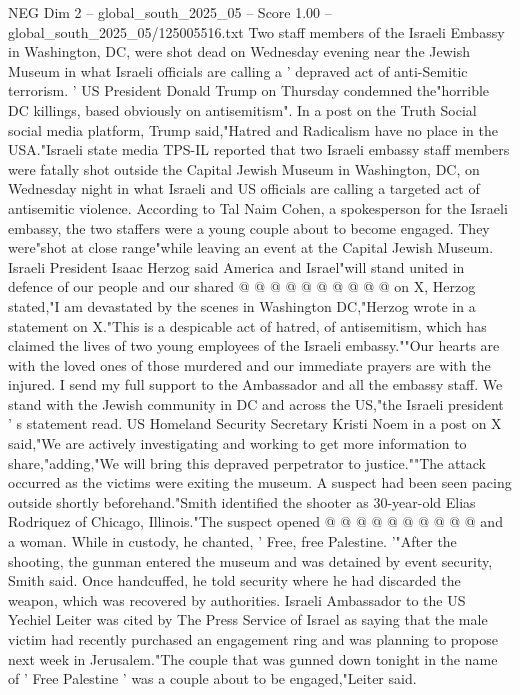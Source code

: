 \begin{textsample}{NEG Dim 2 – global\_south\_2025\_05 – Score 1.00 – global\_south\_2025\_05/125005516.txt}  \label{ex:f2_neg_408}
Two staff members of the Israeli Embassy in Washington, DC, were shot dead on Wednesday evening near the Jewish Museum in what Israeli officials are calling a ' depraved act of anti-Semitic terrorism. ' US President Donald Trump on Thursday condemned the"horrible DC killings, based obviously on antisemitism".
In a post on the Truth Social social media platform, Trump said,"Hatred and Radicalism have no place in the USA."Israeli state media TPS-IL reported that two Israeli embassy staff members were fatally shot outside the Capital Jewish Museum in Washington, DC, on Wednesday night in what Israeli and US officials are calling a targeted act of antisemitic violence.
According to Tal Naim Cohen, a spokesperson for the Israeli embassy, the two staffers were a young couple about to become engaged.
They were"shot at close range"while leaving an event at the Capital Jewish Museum.
Israeli President Isaac Herzog said America and Israel"will stand united in defence of our people and our shared @ @ @ @ @ @ @ @ @ @ on X, Herzog stated,"I am devastated by the scenes in Washington DC,"Herzog wrote in a statement on X."This is a despicable act of hatred, of antisemitism, which has claimed the lives of two young employees of the Israeli embassy.""Our hearts are with the loved ones of those murdered and our immediate prayers are with the injured.
I send my full support to the Ambassador and all the embassy staff.
We stand with the Jewish community in DC and across the US,"the Israeli president ' s statement read.
US Homeland Security Secretary Kristi Noem in a post on X said,"We are actively investigating and working to get more information to share,"adding,"We will bring this depraved perpetrator to justice.""The attack occurred as the victims were exiting the museum.
A suspect had been seen pacing outside shortly beforehand."Smith identified the shooter as 30-year-old Elias Rodriquez of Chicago, Illinois."The suspect opened @ @ @ @ @ @ @ @ @ @ and a woman.
While in custody, he chanted, ' Free, free Palestine. '"After the shooting, the gunman entered the museum and was detained by event security, Smith said.
Once handcuffed, he told security where he had discarded the weapon, which was recovered by authorities.
Israeli Ambassador to the US Yechiel Leiter was cited by The Press Service of Israel as saying that the male victim had recently purchased an engagement ring and was planning to propose next week in Jerusalem."The couple that was gunned down tonight in the name of ' Free Palestine ' was a couple about to be engaged,"Leiter said.

\end{textsample}
